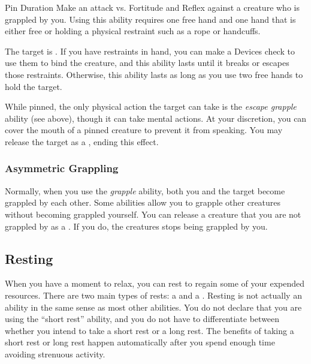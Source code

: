             \begin{durationability}{Pin}
                Duration
                \rankline
                Make an attack vs. Fortitude and Reflex against a creature who is grappled by you.
                Using this ability requires one free hand and one hand that is either free or holding a physical restraint such as a rope or handcuffs.

                \hit The target is \helpless.
                If you have restraints in hand, you can make a Devices check to use them to bind the creature, and this ability lasts until it breaks or escapes those restraints.
                Otherwise, this ability lasts as long as you use two free hands to hold the target.

                While pinned, the only physical action the target can take is the \textit{escape grapple} ability (see above), though it can take mental actions.
                At your discretion, you can cover the mouth of a pinned creature to prevent it from speaking.
                You may release the target as a , ending this effect.
            \end{durationability}

        \subsubsection{Asymmetric Grappling}\label{Asymmetric Grappling}
            Normally, when you use the \textit{grapple} ability, both you and the target become grappled by each other.
            Some abilities allow you to grapple other creatures without becoming grappled yourself.
            You can release a creature that you are not grappled by as a .
            If you do, the creatures stops being grappled by you.

    \subsection{Resting}\label{Resting}
        When you have a moment to relax, you can rest to regain some of your expended resources.
        There are two main types of rests: a  and a .
        Resting is not actually an ability in the same sense as most other abilities.
        You do not declare that you are using the ``short rest'' ability, and you do not have to differentiate between whether you intend to take a short rest or a long rest.
        The benefits of taking a short rest or long rest happen automatically after you spend enough time avoiding strenuous activity.

